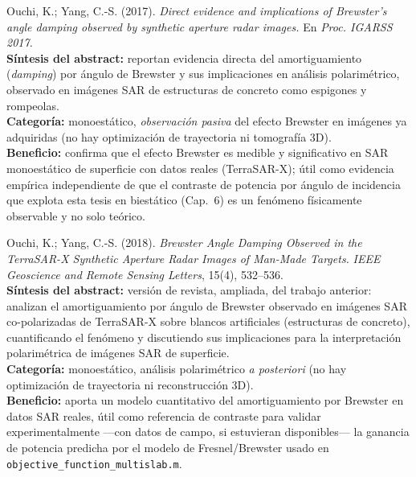 \documentclass[11pt,a4paper]{article}
\begin{document}
\begin{enumerate}[label=\textbf{[E\arabic*]}, leftmargin=2.2cm, itemsep=10pt]

\item Ouchi, K.; Yang, C.-S. (2017). \textit{Direct evidence and
implications of Brewster's angle damping observed by synthetic aperture
radar images.} En \emph{Proc. IGARSS 2017.} \cite{ouchi2017}\\
\textbf{Síntesis del abstract:} reportan evidencia directa del
amortiguamiento (\emph{damping}) por ángulo de Brewster y sus implicaciones
en análisis polarimétrico, observado en imágenes SAR de estructuras de
concreto como espigones y rompeolas.\\
\textbf{Categoría:} monoestático, \emph{observación pasiva} del efecto
Brewster en imágenes ya adquiridas (no hay optimización de trayectoria ni
tomografía 3D).\\
\textbf{Beneficio:} confirma que el efecto Brewster es medible y
significativo en SAR monoestático de superficie con datos reales
(TerraSAR-X); útil como evidencia empírica independiente de que el
contraste de potencia por ángulo de incidencia que explota esta tesis en
biestático (Cap.~6) es un fenómeno físicamente observable y no solo
teórico.

\item Ouchi, K.; Yang, C.-S. (2018). \textit{Brewster Angle Damping
Observed in the TerraSAR-X Synthetic Aperture Radar Images of Man-Made
Targets.} \emph{IEEE Geoscience and Remote Sensing Letters}, 15(4),
532--536. \cite{ouchi2018}\\
\textbf{Síntesis del abstract:} versión de revista, ampliada, del trabajo
anterior: analizan el amortiguamiento por ángulo de Brewster observado en
imágenes SAR co-polarizadas de TerraSAR-X sobre blancos artificiales
(estructuras de concreto), cuantificando el fenómeno y discutiendo sus
implicaciones para la interpretación polarimétrica de imágenes SAR de
superficie.\\
\textbf{Categoría:} monoestático, análisis polarimétrico \emph{a
posteriori} (no hay optimización de trayectoria ni reconstrucción 3D).\\
\textbf{Beneficio:} aporta un modelo cuantitativo del amortiguamiento por
Brewster en datos SAR reales, útil como referencia de contraste para
validar experimentalmente —con datos de campo, si estuvieran disponibles—
la ganancia de potencia predicha por el modelo de Fresnel/Brewster usado en
\texttt{objective\_function\_multislab.m}.


\end{enumerate}
\end{document}

